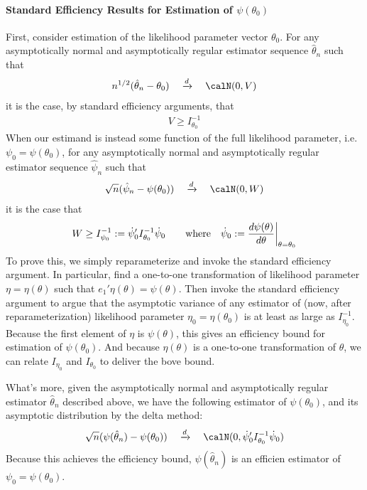 \documentclass[12pt]{article}
\theoremstyle{plain}
\theoremstyle{definition}
\theoremstyle{remark}
\newcommand{\dto}{\xrightarrow{d}}
\begin{document}
\paragraph{Standard Efficiency Results for Estimation of $\psi(\theta_0)$}
First, consider estimation of the likelihood parameter vector
$\theta_0$.
For any asymptotically normal and asymptotically regular estimator
sequence $\hat{\theta}_n$ such that
\begin{align*}
  n^{1/2}(\hat{\theta}_n-\theta_0)
  \quad
  \dto
  \quad
  \calN(0,V)
\end{align*}
it is the case, by standard efficiency arguments, that
\begin{align*}
  V \geq I_{\theta_0}^{-1}
\end{align*}
When our estimand is instead some function of the full likelihood
parameter, i.e. $\psi_0=\psi(\theta_0)$, for any asymptotically normal
and asymptotically regular estimator sequence $\hat{\psi}_n$ such that
\begin{align*}
  \sqrt{n}(\hat{\psi}_n-\psi(\theta_0))
  \quad\dto\quad
  \calN(0,W)
\end{align*}
it is the case that
\begin{align*}
  W \geq I_{\psi_0}^{-1} := \dot{\psi}_0'I_{\theta_0}^{-1}\dot{\psi}_0
  \qquad\text{where}\quad
  \dot{\psi}_0
  :=
  \frac{%
    d\psi(\theta)
  }{%
    d\theta
  }
  \bigg|_{\theta=\theta_0}
\end{align*}
To prove this, we simply reparameterize and invoke the standard
efficiency argument. In particular, find a one-to-one transformation of
likelihood parameter $\eta=\eta(\theta)$ such that
$e_1'\eta(\theta)=\psi(\theta)$.
Then invoke the standard efficiency argument to argue that the
asymptotic variance of any estimator of (now, after reparameterization)
likelihood parameter $\eta_0=\eta(\theta_0)$ is at least as large as
$I^{-1}_{\eta_0}$.
Because the first element of $\eta$ is $\psi(\theta)$, this gives an
efficiency bound for estimation of $\psi(\theta_0)$.
And because $\eta(\theta)$ is a one-to-one transformation of $\theta$,
we can relate $I_{\eta_0}$ and $I_{\theta_0}$ to deliver the bove bound.

What's more, given the asymptotically normal and asymptotically regular
estimator $\hat{\theta}_n$ described above, we have
the following estimator of $\psi(\theta_0)$, and its asymptotic
distribution by the delta method:
\begin{align*}
  \sqrt{n}(\psi(\hat{\theta}_n)-\psi(\theta_0))
  \quad\dto\quad
  \calN(0,
  \dot{\psi}_0'I_{\theta_0}^{-1}\dot{\psi}_0
  )
\end{align*}
Because this achieves the efficiency bound, $\psi(\hat{\theta}_n)$ is an
efficien estimator of $\psi_0=\psi(\theta_0)$.
\end{document}
